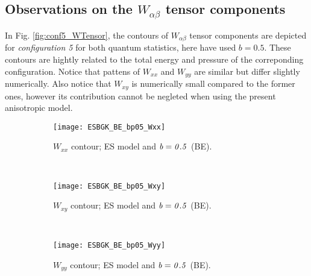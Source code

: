 \documentclass{rsproca}%
\begin{document}
\subsection{Observations on the $W_{\alpha \beta}$ tensor components}
In Fig. \ref{fig:conf5_WTensor}, the contours of $W_{\alpha \beta}$ tensor components are depicted for \emph{configuration 5} for both quantum statistics, here have used $b=0.5$. These contours are hightly related to the total energy and pressure of the correponding configuration. Notice that pattens of $W_{xx}$ and $W_{yy}$ are similar but differ slightly numerically. Also notice that $W_{xy}$ is numerically small compared to the former ones, however its contribution cannot be negleted when using the present anisotropic model.

\begin{figure}
        \centering
        \begin{subfigure}[b]{0.32\textwidth}
                \centering
                \texttt{[image: ESBGK\_BE\_bp05\_Wxx]}
                \caption{$W_{xx}$ contour; ES model and $\it{b=0.5}$ (BE).}
                \label{fig:5ESBGK_BE_bp05_Wxx}
        \end{subfigure}%
        ~ %
        \begin{subfigure}[b]{0.32\textwidth}
                \centering
                \texttt{[image: ESBGK\_BE\_bp05\_Wxy]}
                \caption{$W_{xy}$ contour; ES model and $\it{b=0.5}$ (BE).}
                \label{fig:5ESBGK_BE_bp05_Wxy}
        \end{subfigure}
        ~ %
        \begin{subfigure}[b]{0.32\textwidth}
                \centering
                \texttt{[image: ESBGK\_BE\_bp05\_Wyy]}
                \caption{$W_{yy}$ contour; ES model and $\it{b=0.5}$ (BE).}
                \label{fig:5ESBGK_BE_bp05_Wyy}
        \end{subfigure}
				~ %
				\begin{subfigure}[b]{0.32\textwidth}
                \centering

\end{subfigure}
\end{figure}
\end{document}
